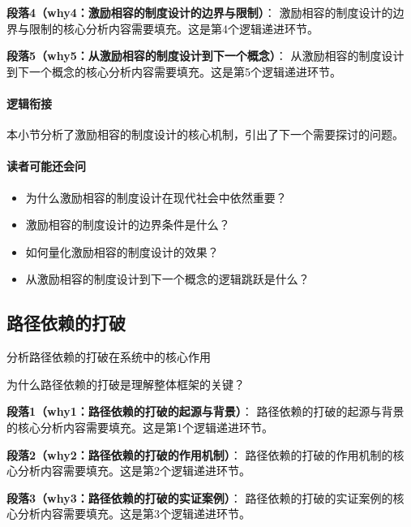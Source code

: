 \documentclass[../main.tex]{subfiles}
\begin{document}
{{\textbf{段落4（why4：激励相容的制度设计的边界与限制）}：
激励相容的制度设计的边界与限制的核心分析内容需要填充。这是第4个逻辑递进环节。


\textbf{段落5（why5：从激励相容的制度设计到下一个概念）}：
从激励相容的制度设计到下一个概念的核心分析内容需要填充。这是第5个逻辑递进环节。


\paragraph*{逻辑衔接}
本小节分析了激励相容的制度设计的核心机制，引出了下一个需要探讨的问题。

\paragraph*{读者可能还会问}
\begin{itemize}
\item 为什么激励相容的制度设计在现代社会中依然重要？
\item 激励相容的制度设计的边界条件是什么？
\item 如何量化激励相容的制度设计的效果？
\item 从激励相容的制度设计到下一个概念的逻辑跳跃是什么？
\end{itemize}


\subsection{路径依赖的打破}

\begin{motivation}
分析路径依赖的打破在系统中的核心作用
\end{motivation}

\begin{logicmap}
[逻辑链占位]
\end{logicmap}

\begin{questionbox}
为什么路径依赖的打破是理解整体框架的关键？
\end{questionbox}

\textbf{段落1（why1：路径依赖的打破的起源与背景）}：
路径依赖的打破的起源与背景的核心分析内容需要填充。这是第1个逻辑递进环节。


\textbf{段落2（why2：路径依赖的打破的作用机制）}：
路径依赖的打破的作用机制的核心分析内容需要填充。这是第2个逻辑递进环节。


\textbf{段落3（why3：路径依赖的打破的实证案例）}：
路径依赖的打破的实证案例的核心分析内容需要填充。这是第3个逻辑递进环节。


}}
\end{document}
